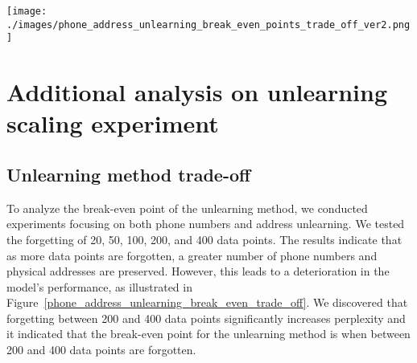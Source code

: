 \begin{comment}
\section{Broader Impacts\label{boarder_impacts}}

Our work proposes a new method for preserving PII in LLMs, and we will explore the societal implications of techniques used for safeguarding PII.

\textbf{Positive impacts.} Safeguarding PII in LLMs while preserving their performance has significant positive implications. For instance, it can protect PII from fine-tuned LLMs with only a minimal drop in performance, ensuring that the LLMs remain effective for their intended purposes.


\textbf{Negative impacts.} Dynamic Mix Selected Unlearning consists of three stages: sensitivity analysis, selected unlearning, and error injection. These stages are unlikely to cause significant negative societal impacts.
\end{comment}


\begin{figure*}[t!]
\centering
  \texttt{[image: ./images/phone\_address\_unlearning\_break\_even\_points\_trade\_off\_ver2.png]}
  \caption{ Unlearning method trade-off: Risk score vs forget number of data. left: phone numbers; right: physical addresses }
  \label{phone_address_unlearning_break_even_trade_off}
\end{figure*}

\section{Additional analysis on unlearning scaling experiment}

\subsection{Unlearning method trade-off}
To analyze the break-even point of the unlearning method, we conducted experiments focusing on both phone numbers and address unlearning. We tested the forgetting of 20, 50, 100, 200, and 400 data points. The results indicate that as more data points are forgotten, a greater number of phone numbers and physical addresses are preserved. However, this leads to a deterioration in the model's performance, as illustrated in Figure~\ref{phone_address_unlearning_break_even_trade_off}. We discovered that forgetting between 200 and 400 data points significantly increases perplexity and it indicated that the break-even point for the unlearning method is when between 200 and 400 data points are forgotten.




